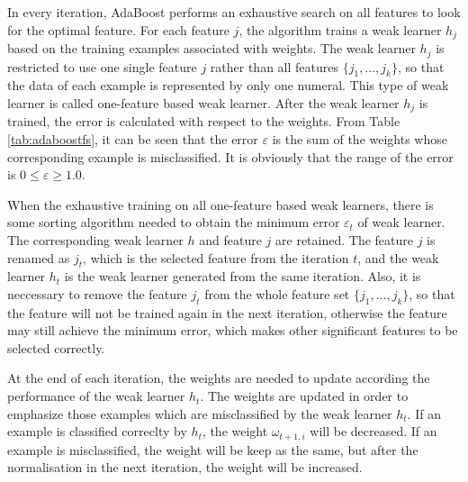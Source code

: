 In every iteration, AdaBoost performs an exhaustive search on all features to look for the optimal feature. For each feature $j$, the algorithm trains a weak learner $h_{j}$ based on the training examples associated with weights. The weak learner $h_{j}$ is restricted to use one single feature $j$ rather than all features $\{j_{1},\ldots,j_{k}\}$, so that the data of each example is represented by only one numeral. This type of weak learner is called one-feature based weak learner. After the weak learner $h_{j}$ is trained, the error is calculated with respect to the weights. From \mbox{Table} \ref{tab:adaboostfs}, it can be seen that the error $\varepsilon$ is the sum of the weights whose corresponding example is misclassified. It is obviously that the range of the error is $0\le \varepsilon \ge 1.0$.

When the exhaustive training on all one-feature based weak learners, there is some sorting algorithm needed to obtain the minimum error $\varepsilon_{t}$ of weak learner. The corresponding weak learner $h$ and feature $j$ are retained. The feature $j$ is renamed as $j_{t}$, which is the selected feature from the iteration $t$, and the weak learner $h_{t}$ is the weak learner generated from the same iteration. Also, it is neccessary to remove the feature $j_{t}$ from the whole feature set $\{j_{1},\ldots,j_{k}\}$, so that the feature will not be trained again in the next iteration, otherwise the feature may still achieve the minimum error, which makes other significant features to be selected correctly.

At the end of each iteration, the weights are needed to update according the performance of the weak learner $h_{t}$.  The weights are updated in order to emphasize those examples which are misclassified by the weak learner $h_{t}$.  If an example is classified correclty by $h_{t}$, the weight $\omega_{t+1,i}$ will be decreased. If an example is misclassified, the weight will be keep as the same, but after the normalisation in the next iteration, the weight will be increased. 


